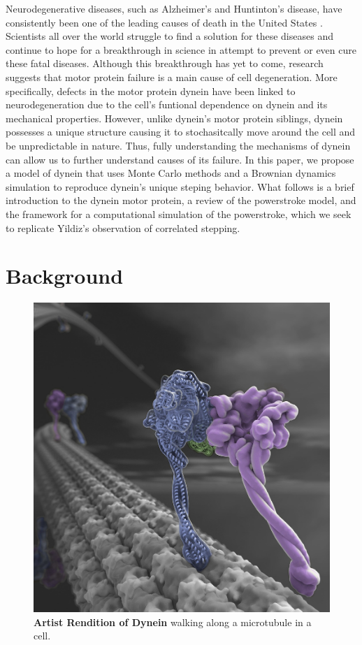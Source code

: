 
	Neurodegenerative diseases, such as Alzheimer's and Huntinton's disease, have consistently been one of the leading causes of death in the United States \cite{eschbach2011cytoplasmic}. Scientists all over the world struggle to find a solution for these diseases and continue to hope for a breakthrough in science in attempt to prevent or even cure these fatal diseases. Although this breakthrough has yet to come, research suggests that motor protein failure is a main cause of cell degeneration. More specifically, defects in the motor protein dynein have been linked to neurodegeneration due to the cell's funtional dependence on dynein and its mechanical properties. However, unlike dynein's motor protein siblings, dynein possesses a unique structure causing it to stochasitcally move around the cell and be unpredictable in nature. Thus, fully understanding the mechanisms of dynein can allow us to further understand causes of its failure. In this paper, we propose a model of dynein that uses Monte Carlo methods and a Brownian dynamics simulation to reproduce dynein's unique steping behavior. What follows is a brief introduction to the dynein motor protein, a review of the powerstroke model, and the framework for a computational simulation of the powerstroke, which we seek to replicate Yildiz's observation of correlated stepping.  

\section{Background}

\begin{figure}[H]
	\centering
	\includegraphics[width=0.5\columnwidth]{Figures/dynein_walking_art.jpg}
	\caption[Artist Rendition of Dynein]{\textbf{Artist Rendition of Dynein} walking along a microtubule in a cell. \cite{JohnsonArt}}
	\label{fig:ArtDynein}
\end{figure}

